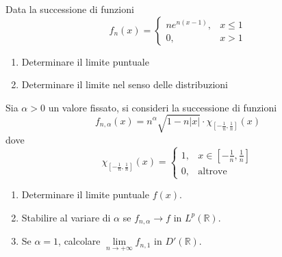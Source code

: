 Data la successione di funzioni
\begin{equation*}
f_{n}( x) =\begin{cases}
ne^{n( x-1)} , & x\leqslant 1\\
0, & x >1
\end{cases}
\end{equation*}
\begin{enumerate}
\item Determinare il limite puntuale
\item Determinare il limite nel senso delle distribuzioni
\end{enumerate}
\Esercizio{}

Sia $\alpha  >0$ un valore fissato, si consideri la successione di funzioni
\begin{equation*}
f_{n,\alpha }( x) =n^{\alpha }\sqrt{1-n| x| } \cdotp \chi _{\left[ -\frac{1}{n} ,\frac{1}{n}\right]}( x)
\end{equation*}
dove
\begin{equation*}
\chi _{\left[ -\frac{1}{n} ,\frac{1}{n}\right]}( x) =\begin{cases}
1, & x\in \left[ -\frac{1}{n} ,\frac{1}{n}\right]\\
0, & \text{altrove}
\end{cases}
\end{equation*}
\begin{enumerate}
\item Determinare il limite puntuale $f( x)$.
\item Stabilire al variare di $\alpha $ se $f_{n,\alpha }\rightarrow f$ in $L^{p}(\mathbb{R})$.
\item Se $\alpha =1$, calcolare $\lim\limits _{n\rightarrow +\infty } f_{n,1}$ in $D'(\mathbb{R})$.
\end{enumerate}
\ParteSoluzioni
\Soluzione
